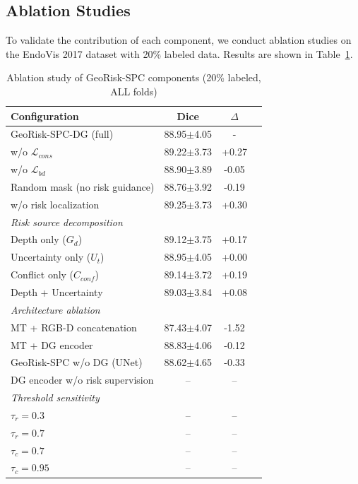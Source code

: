 \documentclass[conference]{IEEEtran}
\begin{document}
\subsection{Ablation Studies}

To validate the contribution of each component, we conduct ablation studies on the EndoVis 2017 dataset with 20\% labeled data. Results are shown in Table~\ref{tab:ablation}.

\begin{table}[htbp]
\caption{Ablation study of GeoRisk-SPC components (20\% labeled, ALL folds)}
\begin{center}
\begin{tabular}{lccc}
\toprule
Configuration & Dice & $\Delta$ \\
\midrule
GeoRisk-SPC-DG (full) & 88.95{\tiny$\pm$4.05} & - \\
\quad w/o $\mathcal{L}_{cons}$ & 89.22{\tiny$\pm$3.73} & +0.27 \\
\quad w/o $\mathcal{L}_{bd}$ & 88.90{\tiny$\pm$3.89} & -0.05 \\
\quad Random mask (no risk guidance) & 88.76{\tiny$\pm$3.92} & -0.19 \\
\quad w/o risk localization & 89.25{\tiny$\pm$3.73} & +0.30 \\
\midrule
\multicolumn{3}{l}{\textit{Risk source decomposition}} \\
\quad Depth only ($G_d$) & 89.12{\tiny$\pm$3.75} & +0.17 \\
\quad Uncertainty only ($U_t$) & 88.95{\tiny$\pm$4.05} & +0.00 \\
\quad Conflict only ($C_{conf}$) & 89.14{\tiny$\pm$3.72} & +0.19 \\
\quad Depth + Uncertainty & 89.03{\tiny$\pm$3.84} & +0.08 \\
\midrule
\multicolumn{3}{l}{\textit{Architecture ablation}} \\
\quad MT + RGB-D concatenation & 87.43{\tiny$\pm$4.07} & -1.52 \\
\quad MT + DG encoder & 88.83{\tiny$\pm$4.06} & -0.12 \\
\quad GeoRisk-SPC w/o DG (UNet) & 88.62{\tiny$\pm$4.65} & -0.33 \\
\quad DG encoder w/o risk supervision & -- & -- \\
\midrule
\multicolumn{3}{l}{\textit{Threshold sensitivity}} \\
\quad $\tau_r = 0.3$ & -- & -- \\
\quad $\tau_r = 0.7$ & -- & -- \\
\quad $\tau_c = 0.7$ & -- & -- \\
\quad $\tau_c = 0.95$ & -- & -- \\
\bottomrule
\end{tabular}
\end{center}
\label{tab:ablation}
\end{table}
\end{document}
